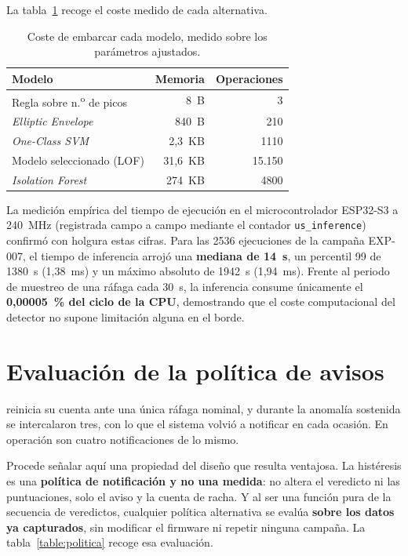 La tabla~\ref{table:coste-inferencia} recoge el coste medido de cada alternativa.

\begin{table}[ht!]
\caption{Coste de embarcar cada modelo, medido sobre los parámetros ajustados.}
\label{table:coste-inferencia}
\centering
\begin{tabular}{|p{5.0cm}|r|r|}
\hline
\textbf{Modelo} & \textbf{Memoria} & \textbf{Operaciones} \\
\hline
Regla sobre n.\textsuperscript{o} de picos & \mbox{8 B} & 3 \\
\hline
\textit{Elliptic Envelope} & \mbox{840 B} & 210 \\
\hline
\textit{One-Class SVM} & \mbox{2,3 KB} & 1110 \\
\hline
Modelo seleccionado (LOF) & \mbox{31,6 KB} & 15.150 \\
\hline
\textit{Isolation Forest} & \mbox{274 KB} & 4800 \\
\hline
\end{tabular}
\end{table}

La medición empírica del tiempo de ejecución en el microcontrolador ESP32-S3 a \mbox{240 MHz}
(registrada campo a campo mediante el contador \texttt{us\_inference}) confirmó con holgura estas
cifras. Para las 2536 ejecuciones de la campaña EXP-007, el tiempo de inferencia arrojó una
\textbf{mediana de \mbox{14 \textmu s}}, un percentil 99 de \mbox{1380 \textmu s} (1,38~ms) y un
máximo absoluto de \mbox{1942 \textmu s} (1,94~ms). Frente al periodo de muestreo de una ráfaga
cada \mbox{30 s}, la inferencia consume únicamente el \textbf{0,00005~\% del ciclo de la CPU},
demostrando que el coste computacional del detector no supone limitación alguna en el borde.

\section{Evaluación de la política de avisos}

reinicia su cuenta ante una única ráfaga nominal, y durante la anomalía sostenida se intercalaron
tres, con lo que el sistema volvió a notificar en cada ocasión. En operación son cuatro
notificaciones de lo mismo.

Procede señalar aquí una propiedad del diseño que resulta ventajosa. La histéresis es una
\textbf{política de notificación y no una medida}: no altera el veredicto ni las puntuaciones,
solo el aviso y la cuenta de racha. Y al ser una función pura de la secuencia de veredictos,
cualquier política alternativa se evalúa \textbf{sobre los datos ya capturados}, sin modificar el
firmware ni repetir ninguna campaña. La tabla~\ref{table:politica} recoge esa evaluación.

